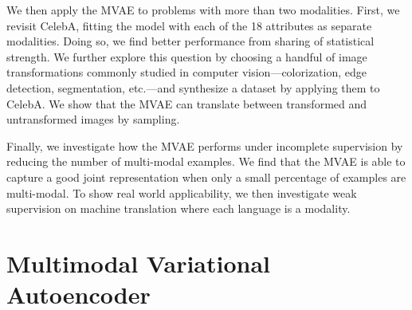 We then apply the MVAE to problems with more than two modalities. First, we revisit CelebA, fitting the model with each of the 18 attributes as separate modalities. Doing so, we find better performance from sharing of statistical strength. We further explore this question by choosing a handful of image transformations commonly studied in computer vision---colorization, edge detection, segmentation, etc.---and synthesize a dataset by applying them to CelebA. We show that the MVAE can translate between transformed and untransformed images by sampling.

Finally, we investigate how the MVAE performs under incomplete supervision by reducing the number of multi-modal examples. We find that the MVAE is able to capture a good joint representation when only a small percentage of examples are multi-modal. To show real world applicability, we then investigate weak supervision on machine translation where each language is a modality.
\section{Multimodal Variational Autoencoder}
\label{sec:methods}

